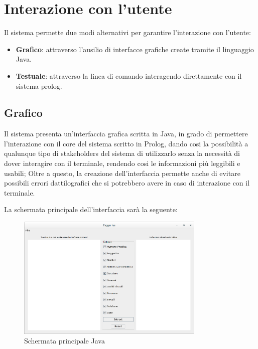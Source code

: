 
\section{Interazione con l'utente}
\label{Interaction}
Il sistema permette due modi alternativi per garantire l'interazione con l'utente:
\begin{itemize}
	\item \textbf{Grafico}: attraverso l'ausilio di interfacce grafiche create tramite il linguaggio Java.
	\item \textbf{Testuale}: attraverso la linea di comando interagendo direttamente con il sistema prolog.
\end{itemize}
\subsection{Grafico}
Il sistema presenta un'interfaccia grafica scritta in Java, in grado di permettere l'interazione con il core del sistema scritto in Prolog, dando cosi la possibilità a qualunque tipo di stakeholders del sistema di utilizzarlo senza la necessità di dover interagire con il terminale, rendendo cosi le informazioni più leggibili e usabili; Oltre a questo, la creazione dell'interfaccia permette anche di evitare possibili errori dattilografici che si potrebbero avere in caso di interazione con il terminale.

La schermata principale dell'interfaccia sarà la seguente:
\begin{figure}[H]
	\centering
	\includegraphics[width=0.8\textwidth]{img/interfaces/java-main.png}
	\caption[Schermata Java main]{Schermata principale Java}
	\label{java-main}
\end{figure}

